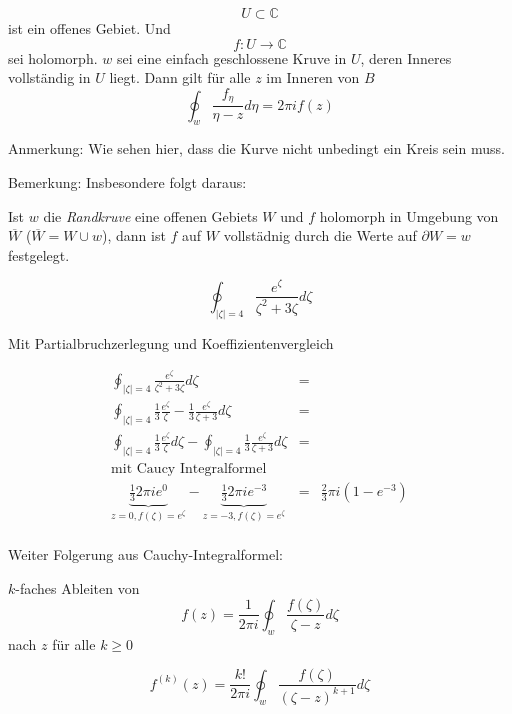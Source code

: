 \documentclass[10pt,a4paper]{article}
\begin{document}

\begin{satz}
$$U \subset \mathbb{C}$$ ist ein offenes Gebiet. Und $$f: U \rightarrow \mathbb{C}$$
sei holomorph. $w$ sei eine einfach geschlossene Kruve in $U$, deren Inneres vollständig in $U$ liegt. Dann gilt für alle $z$ im Inneren von $B$
$$\oint_w \frac{f_\eta}{\eta-z} d\eta = 2 \pi i f(z)$$

Anmerkung: Wie sehen hier, dass die Kurve nicht unbedingt ein Kreis sein muss.
\end{satz}

Bemerkung: Insbesondere folgt daraus:

Ist $w$ die \emph{Randkruve} eine offenen Gebiets $W$ und $f$ holomorph in Umgebung von $\overline{W}$ ($\overline{W}=W \cup w$), dann ist $f$ auf $W$ vollstädnig durch die Werte auf $\partial W = w$ festgelegt.

\begin{bsp}

$$\oint_{|\zeta|=4} \frac{e^{\zeta}}{\zeta^{2}+3 \zeta} d\zeta$$

Mit Partialbruchzerlegung und Koeffizientenvergleich

\begin{eqnarray*}
\oint_{|\zeta|=4} \frac{e^{\zeta}}{\zeta^{2}+3 \zeta} d\zeta &=& \\
\oint_{|\zeta|=4} \frac{1}{3} \frac{e^{\zeta}}{\zeta} - \frac{1}{3} \frac{e^{\zeta}}{\zeta + 3} d\zeta &=& \\
\oint_{|\zeta|=4} \frac{1}{3} \frac{e^{\zeta}}{\zeta} d\zeta -  \oint_{|\zeta|=4} \frac{1}{3} \frac{e^{\zeta}}{\zeta + 3} d\zeta &=& \\
\text{mit Caucy Integralformel} \\
\underbrace{\frac{1}{3} 2\pi i e^{0}}_{z=0, f(\zeta)=e^{\zeta}} - \underbrace{\frac{1}{3} 2 \pi i e^{-3}}_{z=-3,f(\zeta)=e^{\zeta}} &=& \frac{2}{3} \pi i (1-e^{-3}) \\
\end{eqnarray*}
\end{bsp}


Weiter Folgerung aus Cauchy-Integralformel:

\begin{satz}

$k$-faches Ableiten von $$f(z)=\frac{1}{2\pi i} \oint_w \frac{f(\zeta)}{\zeta - z} d\zeta$$ nach $z$ für alle $k \geq 0$

$$f^{(k)}(z) = \frac{k!}{2 \pi i} \oint_w \frac{f(\zeta)}{(\zeta - z)^{k+1}} d \zeta$$
\end{satz}
\end{document}
